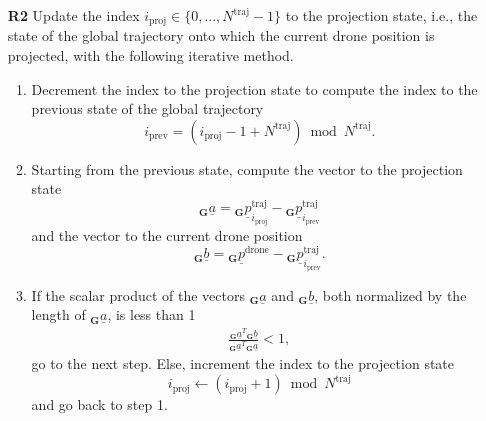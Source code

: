 \begin{itemize}
    
    \item [\textbf{R2}] Update the index $i_\text{proj} \in \{0, ..., N^\text{traj}-1\}$ to the projection state,
    i.e., the state of the global trajectory
    onto which the current drone position is projected,
    with the following iterative method.
    \begin{enumerate}
        \item Decrement the index to the projection state 
        to compute the index to the previous state of the global trajectory
        \begin{equation}
            i_\text{prev} = (i_\text{proj} - 1 + N^\text{traj}) \bmod N^\text{traj}.
        \end{equation}
        \item Starting from the previous state, 
        compute the vector to the projection state
        \begin{equation} \label{eq:vec_prev_state_2_proj_state}
            {}_\textbf{G} \underline a 
            = 
            {}_\textbf{G} \underline p^\text{traj}_{i_\text{proj}}
            - 
            {}_\textbf{G} \underline p^\text{traj}_{i_\text{prev}}
        \end{equation}
        and the vector to the current drone position
        \begin{equation} \label{eq:vec_prev_state_2_drone}
            {}_\textbf{G} \underline b 
            = 
            {}_\textbf{G} \underline p^\text{drone}
            - 
            {}_\textbf{G} \underline p^\text{traj}_{i_\text{prev}}.
        \end{equation}
        \item If the scalar product of the vectors ${}_\textbf{G} \underline a$ and ${}_\textbf{G} \underline b$, 
        both normalized by the length of ${}_\textbf{G} \underline a$,
        is less than 1
        \begin{align} \label{eq:norm_dot_prod_criterion}
            \frac{{}_\textbf{G} \underline a ^T {}_\textbf{G} \underline b}{{}_\textbf{G} \underline a ^T {}_\textbf{G} \underline a} < 1,
        \end{align}
        go to the next step. 
        Else, increment the index to the projection state
        \begin{equation}
            i_\text{proj} \leftarrow (i_\text{proj} + 1) \bmod N^\text{traj}
        \end{equation}
        and go back to step 1.

\end{enumerate}
\end{itemize}
